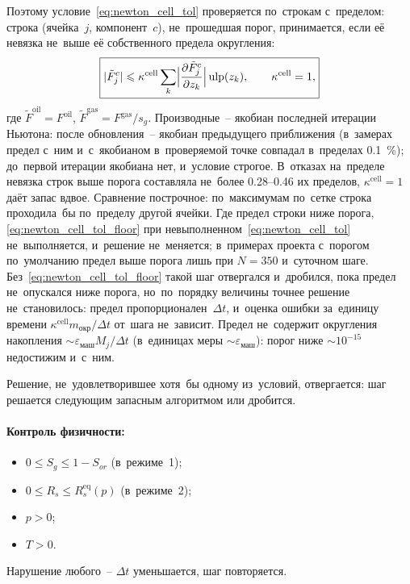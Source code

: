 \documentclass[12pt,a4paper]{article}
\begin{document}
Поэтому условие~\eqref{eq:newton_cell_tol} проверяется по~строкам с~пределом: строка
(ячейка~$j$, компонент~$c$), не~прошедшая порог, принимается, если её невязка не~выше
её собственного предела округления:
\begin{equation}\label{eq:newton_cell_tol_floor}
  \boxed{|\tilde F_j^{c}| \leqslant \kappa^{\text{cell}}
    \sum_k \Bigl|\frac{\partial \tilde F_j^{c}}{\partial z_k}\Bigr|
    \operatorname{ulp}(z_k),\qquad \kappa^{\text{cell}} = 1,}
\end{equation}
где $\tilde F^{\text{oil}} = F^{\text{oil}}$, $\tilde F^{\text{gas}} = F^{\text{gas}}/s_g$.
Производные~-- якобиан последней итерации Ньютона: после обновления~-- якобиан
предыдущего приближения (в~замерах предел с~ним и~с~якобианом в~проверяемой точке
совпадал в~пределах 0.1~\%); до~первой итерации якобиана нет, и~условие строгое.
В~отказах на~пределе невязка строк выше порога составляла не~более 0.28--0.46
их пределов, $\kappa^{\text{cell}} = 1$ даёт запас вдвое. Сравнение построчное:
по~максимумам по~сетке строка проходила~бы по~пределу другой ячейки. Где предел
строки ниже порога, \eqref{eq:newton_cell_tol_floor} при
невыполненном~\eqref{eq:newton_cell_tol} не~выполняется, и~решение не~меняется;
в~примерах проекта с~порогом по~умолчанию предел выше порога лишь при $N = 350$
и~суточном шаге. Без~\eqref{eq:newton_cell_tol_floor} такой шаг отвергался и~дробился,
пока предел не~опускался ниже порога, но~по~порядку величины точнее решение
не~становилось: предел пропорционален~$\Delta t$, и~оценка ошибки за~единицу времени
$\kappa^{\text{cell}} m_{\text{окр}}/\Delta t$ от~шага не~зависит. Предел не~содержит
округления накопления $\sim\varepsilon_{\text{маш}} M_j/\Delta t$ (в~единицах меры
$\sim\varepsilon_{\text{маш}}$): порог ниже $\sim10^{-15}$ недостижим и~с~ним.

Решение, не~удовлетворившее хотя~бы одному из~условий, отвергается: шаг решается
следующим запасным алгоритмом или дробится.

\paragraph{Контроль физичности:}
\begin{itemize}[nosep]
  \item $0 \leqslant S_g \leqslant 1 - S_{or}$ (в~режиме~1);
  \item $0 \leqslant R_s \leqslant R_s^{\text{eq}}(p)$ (в~режиме~2);
  \item $p > 0$;
  \item $T > 0$.
\end{itemize}
Нарушение любого~-- $\Delta t$ уменьшается, шаг повторяется.
\end{document}
